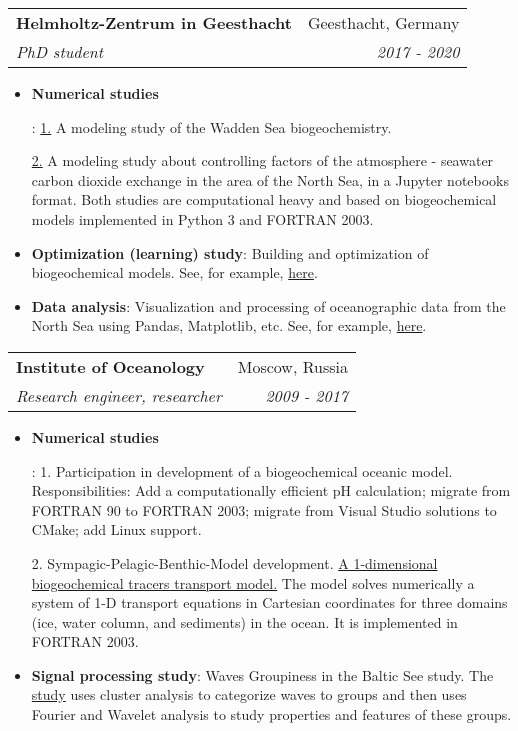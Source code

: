 \documentclass[letterpaper,11pt]{article}
\makeatletter
\newcommand{\resumeItem}[2]{
  \item\small{
    \textbf{#1}{: #2 \vspace{-2pt}}
  }
}
\newcommand{\resumeSubheading}[4]{
  \vspace{-1pt}\item
    \begin{tabular*}{0.97\textwidth}[t]{l@{\extracolsep{\fill}}r}
      \textbf{#1} & #2 \\
      \textit{\small#3} & \textit{\small #4} \\
    \end{tabular*}\vspace{-5pt}
}
\newcommand{\resumeItemListStart}{\begin{itemize}}
\newcommand{\resumeItemListEnd}{\end{itemize}\vspace{-5pt}}
\makeatother
\begin{document}
    \resumeSubheading
      {Helmholtz-Zentrum in Geesthacht}{Geesthacht, Germany}{PhD student}{2017 - 2020}
      \resumeItemListStart
        \resumeItem{Numerical studies}
        
          {\href{https://github.com/limash/Alkalinity_in_the_Wadden_Sea}{1.}
          A modeling study of the Wadden Sea biogeochemistry.
          
          \href{https://github.com/limash/Carbon_dioxide_absorption_drivers}{2.} 
          A modeling study about controlling factors of the atmosphere - seawater carbon dioxide exchange in the area of the North Sea, in a Jupyter notebooks format. 
          Both studies are computational heavy and based on biogeochemical models implemented in Python 3 and FORTRAN 2003.}
        \resumeItem{Optimization (learning) study}
          {Building and optimization of biogeochemical models. See, for example, \href{https://github.com/BottomRedoxModel/brom_niva_module/tree/dev-sham}{here}.}
        \resumeItem{Data analysis}
          {Visualization and processing of oceanographic data from the North Sea using Pandas, Matplotlib, etc. See, for example, \href{https://github.com/limash/helgoland_alkalinity/blob/master/vizualize.ipynb}{here}.}
      \resumeItemListEnd
      
    \resumeSubheading
      {Institute of Oceanology}{Moscow, Russia}
      {Research engineer, researcher}{2009 - 2017}
      \resumeItemListStart
        \resumeItem{Numerical studies}
        
          {1. Participation in development of a biogeochemical oceanic model.
          Responsibilities: 
          Add a computationally efficient pH calculation; 
          migrate from FORTRAN 90 to FORTRAN 2003;
          migrate from Visual Studio solutions to CMake;
          add Linux support.
          
      	  2. Sympagic-Pelagic-Benthic-Model development.
          \href{https://github.com/BottomRedoxModel/SPBM}{A 1-dimensional biogeochemical tracers transport model.}
          The model solves numerically a system of 1-D transport equations in Cartesian coordinates for three domains (ice, water column, and sediments) in the ocean.
          It is implemented in FORTRAN 2003.}
        \resumeItem{Signal processing study}
          {Waves Groupiness in the Baltic See study.
          The \href{https://doi.org/10.3103/S1068373916110054}{study} uses cluster analysis to categorize waves to groups and then uses Fourier and Wavelet analysis to study properties and features of these groups.}
      \resumeItemListEnd
\end{document}
